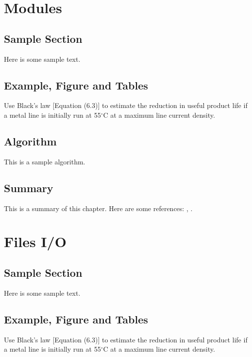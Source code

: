 \documentclass{wileySix}
\begin{document}
\chapter{Modules}

\section{Sample Section}
Here is some sample text.

\section{Example, Figure and Tables}
\vskip6pt
\begin{example}
	Use Black's law [Equation (6.3)] to estimate the reduction in useful product
	life if a metal line is initially run at 55$^\circ$C at a maximum line
	current density.
\end{example}

\section{Algorithm}
This is a sample algorithm.

\section{Summary}
This is a summary of this chapter.
Here are some references: \cite{xkilby}, \cite{xberen}.

\chapter{Files I/O}

\section{Sample Section}
Here is some sample text.

\section{Example, Figure and Tables}
\vskip6pt
\begin{example}
	Use Black's law [Equation (6.3)] to estimate the reduction in useful product
	life if a metal line is initially run at 55$^\circ$C at a maximum line
	current density.
\end{example}
\end{document}
